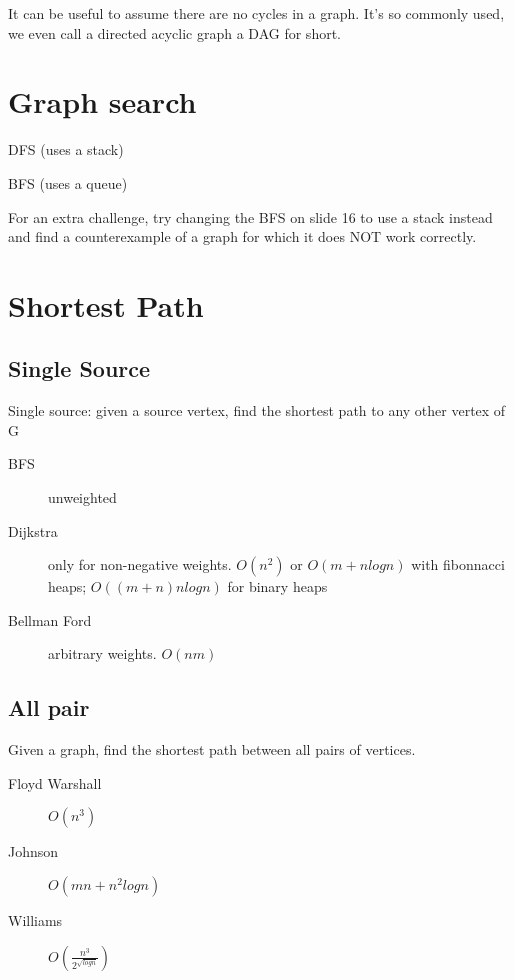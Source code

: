 \documentclass[a4paper]{article}
\newenvironment{itemize*}%
  {\begin{itemize}%
    \setlength{\itemsep}{0pt}%
    \setlength{\parsep}{0pt}%
    \setlength{\parskip}{0pt}}%
  {\end{itemize}}
\begin{document}
It can be useful to assume there are no cycles in a graph. It's so commonly used, we even call a directed acyclic graph a DAG for short.

\section{Graph search}

\begin{itemize*}
\item DFS (uses a stack)
\item BFS (uses a queue)
\end{itemize*}

For an extra challenge, try changing the BFS on slide 16 to use a stack instead and find a counterexample of a graph for which it does NOT work correctly.

\section{Shortest Path}

\subsection{Single Source}
Single source: given a source vertex, find the shortest path to any other vertex of G

\begin{description}
  \item [BFS] unweighted
  \item [Dijkstra] only for non-negative weights. $O(n^2)$ or $O(m + nlogn)$ with fibonnacci heaps; $O((m+n)nlogn)$ for binary heaps
  \item [Bellman Ford] arbitrary weights. $O(nm)$
\end{description}

\subsection{All pair}
Given a graph, find the shortest path between all pairs of vertices.

\begin{description}
  \item [Floyd Warshall] $O(n^3)$
  \item [Johnson] $O(mn + n^2logn)$
  \item [Williams] $O(\frac{n^3}{2^{\sqrt{logn}}})$
\end{description}
\end{document}
